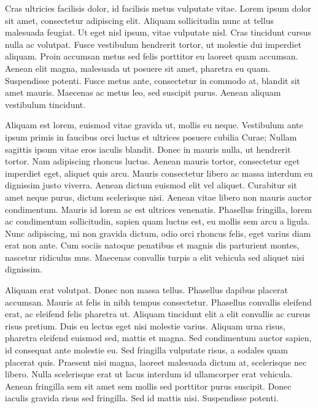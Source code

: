 \documentclass[11pt]{article}
\begin{document}
Cras ultricies facilisis dolor, id facilisis metus vulputate vitae. Lorem ipsum dolor sit amet, consectetur adipiscing elit. Aliquam sollicitudin nunc at tellus malesuada feugiat. Ut eget nisl ipsum, vitae vulputate nisl. Cras tincidunt cursus nulla ac volutpat. Fusce vestibulum hendrerit tortor, ut molestie dui imperdiet aliquam. Proin accumsan metus sed felis porttitor eu laoreet quam accumsan. Aenean elit magna, malesuada ut posuere sit amet, pharetra eu quam. Suspendisse potenti. Fusce metus ante, consectetur in commodo at, blandit sit amet mauris. Maecenas ac metus leo, sed suscipit purus. Aenean aliquam vestibulum tincidunt.

Aliquam est lorem, euismod vitae gravida ut, mollis eu neque. Vestibulum ante ipsum primis in faucibus orci luctus et ultrices posuere cubilia Curae; Nullam sagittis ipsum vitae eros iaculis blandit. Donec in mauris nulla, ut hendrerit tortor. Nam adipiscing rhoncus luctus. Aenean mauris tortor, consectetur eget imperdiet eget, aliquet quis arcu. Mauris consectetur libero ac massa interdum eu dignissim justo viverra. Aenean dictum euismod elit vel aliquet. Curabitur sit amet neque purus, dictum scelerisque nisi. Aenean vitae libero non mauris auctor condimentum. Mauris id lorem ac est ultrices venenatis. Phasellus fringilla, lorem ac condimentum sollicitudin, sapien quam luctus est, eu mollis sem arcu a ligula. Nunc adipiscing, mi non gravida dictum, odio orci rhoncus felis, eget varius diam erat non ante. Cum sociis natoque penatibus et magnis dis parturient montes, nascetur ridiculus mus. Maecenas convallis turpis a elit vehicula sed aliquet nisi dignissim.

Aliquam erat volutpat. Donec non massa tellus. Phasellus dapibus placerat accumsan. Mauris at felis in nibh tempus consectetur. Phasellus convallis eleifend erat, ac eleifend felis pharetra ut. Aliquam tincidunt elit a elit convallis ac cursus risus pretium. Duis eu lectus eget nisi molestie varius. Aliquam urna risus, pharetra eleifend euismod sed, mattis et magna. Sed condimentum auctor sapien, id consequat ante molestie eu. Sed fringilla vulputate risus, a sodales quam placerat quis. Praesent nisi magna, laoreet malesuada dictum at, scelerisque nec libero. Nulla scelerisque erat ut lacus interdum id ullamcorper erat vehicula. Aenean fringilla sem sit amet sem mollis sed porttitor purus suscipit. Donec iaculis gravida risus sed fringilla. Sed id mattis nisi. Suspendisse potenti.
\end{document}
